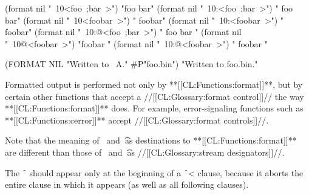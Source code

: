 \code
 (format nil "~10<foo~;bar~>")   \EV "foo    bar"
 (format nil "~10:<foo~;bar~>")  \EV "  foo  bar"
 (format nil "~10<foobar~>")     \EV "    foobar"
 (format nil "~10:<foobar~>")    \EV "    foobar"
 (format nil "~10:@<foo~;bar~>") \EV "  foo bar "
 (format nil "~10@<foobar~>")    \EV "foobar    "
 (format nil "~10:@<foobar~>")   \EV "  foobar  "
\endcode

\code
  (FORMAT NIL "Written to ~A." #P"foo.bin")
  \EV "Written to foo.bin."
\endcode


\endsubsection%



Formatted output is performed not only by **[[CL:Functions:format]]**,
but by certain other functions that accept a //[[CL:Glossary:format control]]//
the way **[[CL:Functions:format]]** does.  For example, error-signaling functions
such as **[[CL:Functions:cerror]]** accept //[[CL:Glossary:format controls]]//.


Note that the meaning of \nil\ and \t\ as destinations to **[[CL:Functions:format]]** 
are different than those of \nil\ and \t\ as //[[CL:Glossary:stream designators]]//.

The \f{~{\hat}} should appear only at the beginning of a \f{~<} clause,
because it aborts the entire clause in which it appears (as well as
all following clauses).                                     

\endsubsection%
